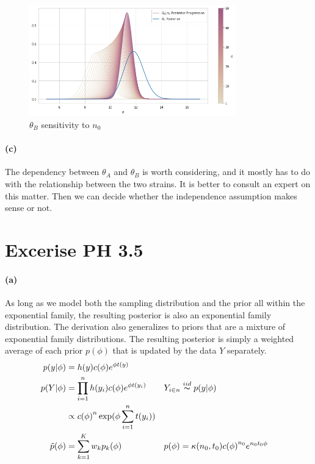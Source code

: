 \documentclass[11pt, letterpaper]{article}
\begin{document}
\begin{figure}[!h]
  \centering
  \includegraphics[width=0.8\textwidth]{3.3.b.png}
  \captionsetup{justification=centering}
  \caption{$\theta_B$ sensitivity to $n_0$}
\end{figure}

\paragraph{(c)}
The dependency between $\theta_A$ and $\theta_B$ is worth considering, and it mostly has to do with the
relationship between the two strains. It is better to consult an expert on this matter. Then we can decide
whether the independence assumption makes sense or not. 
\newpage


\section{Excerise PH 3.5}
\paragraph{(a)}
As long as we model both the sampling distribution and the prior all within the exponential family, the resulting
posterior is also an exponential family distribution. The derivation also generalizes to priors that are
a mixture of exponential family distributions. The resulting posterior is simply a weighted average
of each prior $p(\phi)$ that is updated by the data $Y$ separately.
\begin{align*}
  p(y|\phi) &= h(y)c(\phi)e^{\phi t(y)} \\
  p(Y|\phi) &= \prod_{i=1}^{n} h(y_i)c(\phi)e^{\phi t(y_i)} && Y_{i \in n} \overset{iid}{\thicksim} p(y|\phi) \\
    &\propto {c(\phi)}^{n} \exp(\phi \sum_{i=1}^{n} t(y_i)) \\
  \tilde{p}(\phi) &= \sum_{k=1}^{K} w_k p_k(\phi) && p(\phi) = \kappa(n_0, t_0) {c(\phi)}^{n_0} e^{n_0 t_0 \phi}
\end{align*}
\end{document}
